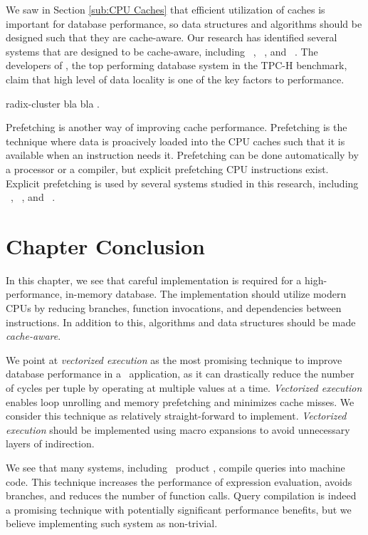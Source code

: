 We saw in Section \ref{sub:CPU Caches} that efficient utilization of caches is important for database performance, so data structures and algorithms should be designed such that they are cache-aware. Our research has identified several systems that are designed to be cache-aware, including \monetdb~\cite{Boncz2002-yq}, \mssql~\cite{Lahiri2015-mz}, and \ibm~\cite{Raman2013-em}. The developers of \exasol, the top performing database system in the TPC-H benchmark, claim that high level of data locality is one of the key factors to performance.

radix-cluster bla bla .

Prefetching is another way of improving cache performance. Prefetching is the technique where data is proacively loaded into the CPU caches such that it is available when an instruction needs it. Prefetching can be done automatically by a processor or a compiler, but explicit prefetching CPU instructions exist. Explicit prefetching is used by several systems studied in this research, including \ibm~\cite{Raman2013-em}, \monetx~\cite{Boncz2005-wj}, and \exasol~\cite{Exasol2014-xh}.


\section{Chapter Conclusion}
\label{sec:Chapter Conclusion}
In this chapter, we see that careful implementation is required for a high-performance, in-memory database. The implementation should utilize modern CPUs by reducing branches, function invocations, and dependencies between instructions. In addition to this, algorithms and data structures should be made \textit{cache-aware}. 

We point at \textit{vectorized execution} as the most promising technique to improve database performance in a \bd~application, as it can drastically reduce the number of cycles per tuple by operating at multiple values at a time. \textit{Vectorized execution} enables loop unrolling and memory prefetching and minimizes cache misses. We consider this technique as relatively straight-forward to implement. \textit{Vectorized execution} should be implemented using macro expansions to avoid unnecessary layers of indirection.

We see that many systems, including \bd~product \qlikview, compile queries into machine code. This technique increases the performance of expression evaluation, avoids branches, and reduces the number of function calls. Query compilation is indeed a promising technique with potentially significant performance benefits, but we believe implementing such system as non-trivial.
